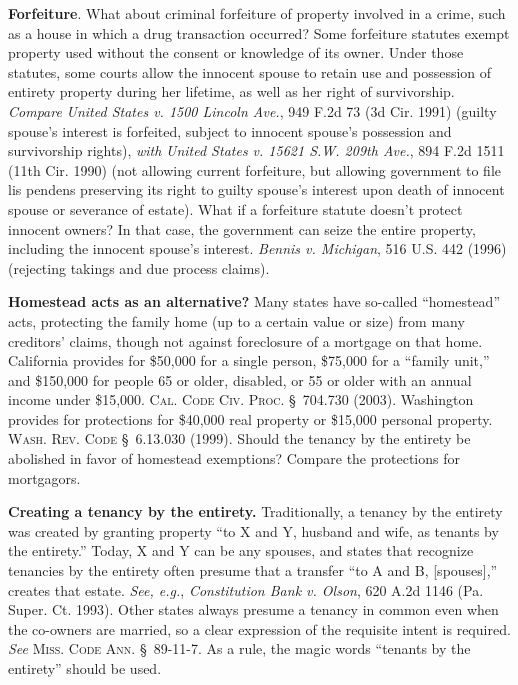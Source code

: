 \item \textbf{Forfeiture}. What about criminal forfeiture of property involved
in a crime, such as a house in which a drug transaction occurred? Some
forfeiture statutes exempt property used without the consent or knowledge of
its owner. Under those statutes, some courts allow the innocent spouse to
retain use and possession of entirety property during her lifetime, as well as
her right of survivorship. \textit{Compare} \emph{United States v. 1500 Lincoln
Ave.}, 949 F.2d 73 (3d Cir. 1991) (guilty spouse's interest is forfeited,
subject to innocent spouse's possession and survivorship rights), \textit{with}
\emph{United States v. 15621 S.W. 209th Ave.}, 894 F.2d 1511 (11th Cir. 1990)
(not allowing current forfeiture, but allowing government to file lis pendens
preserving its right to guilty spouse's interest upon death of innocent spouse
or severance of estate). What if a forfeiture statute doesn't protect innocent
owners? In that case, the government can seize the entire property, including
the innocent spouse's interest. \emph{Bennis v. Michigan}, 516 U.S. 442 (1996)
(rejecting takings and due process claims).


\item \textbf{Homestead acts as an alternative?} Many states have so-called
``homestead'' acts, protecting the family home (up to a certain value or size)
from many creditors' claims, though not against foreclosure of a mortgage on
that home. California provides for \$50,000 for a single person, \$75,000 for a
``family unit,'' and \$150,000 for people 65 or older, disabled, or 55 or older
with an annual income under \$15,000. \textsc{Cal. Code Civ. Proc.} \S~704.730
(2003). Washington provides for protections for \$40,000 real property or
\$15,000 personal property. \textsc{Wash. Rev. Code} \S~6.13.030 (1999). Should
the tenancy by the entirety be abolished in favor of homestead exemptions?
Compare the protections for mortgagors.


\item \textbf{Creating a tenancy by the entirety.} Traditionally, a tenancy by
the entirety was created by granting property ``to X and Y, husband and wife,
as tenants by the entirety.'' Today, X and Y can be any spouses, and states
that recognize tenancies by the entirety often presume that a transfer ``to A
and B, [spouses],'' creates that estate. \emph{See, e.g.}, \emph{Constitution
Bank v. Olson}, 620 A.2d 1146 (Pa. Super. Ct. 1993). Other states always presume
a tenancy in common even when the co-owners are married, so a clear expression
of the requisite intent is required. \emph{See} \textsc{Miss. Code Ann.}
\S~89-11-7. As a rule, the magic words ``tenants by the entirety'' should be
used.


